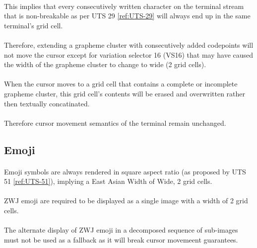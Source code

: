 \documentclass{article}
\begin{document}
\paragraph*{}
This implies that every consecutively written character on the terminal
stream that is non-breakable as per UTS 29 \ref{ref:UTS-29} will
always end up in the same terminal's grid cell.

\paragraph*{}
Therefore, extending a grapheme cluster with consecutively added codepoints
will not move the cursor except for variation selector 16 (VS16) that may
have caused the width of the grapheme cluster to change to wide (2 grid cells).

\paragraph*{}
When the cursor moves to a grid cell that contains a complete or incomplete
grapheme cluster, this grid cell's contents will be erased and overwritten
rather then textually concatinated.

\paragraph*{}
Therefore cursor movement semantics of the terminal remain unchanged.

\subsection{Emoji}

\paragraph*{}
Emoji symbols are always rendered in square aspect ratio
(as proposed by UTS 51 \ref{ref:UTS-51}),
implying a East Asian Width of Wide, 2 grid cells.

\paragraph*{}
ZWJ emoji are required to be displayed as a single image with a width of 2
grid cells.

\paragraph*{}
The alternate display of ZWJ emoji in a decomposed sequence of sub-images
must not be used as a fallback as it will break cursor movemeent guarantees.
\end{document}

